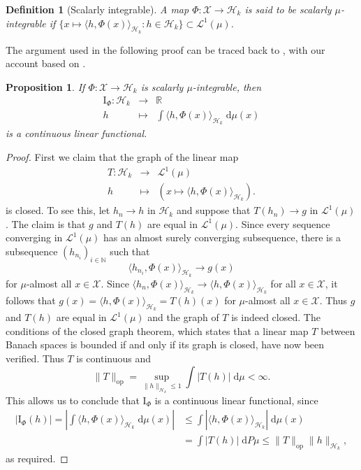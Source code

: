 \documentclass[12pt,paper=letter]{scrreprt}
\newtheorem{proposition}{Proposition}[chapter]
\newtheorem{definition}{Definition}[chapter]
\begin{document}
\begin{definition}[Scalarly integrable]
A map $\Phi : \mathcal{X} \rightarrow \mathcal{H}_k$ is said to be \emph{scalarly} $\mu$-\emph{integrable} if $\{ x \mapsto \langle h , \Phi(x) \rangle_{\mathcal{H}_k} : h \in \mathcal{H}_k \} \subset \mathcal{L}^1(\mu)$.
\end{definition}

\noindent The argument used in the following proof can be traced back to \citet{dunford1937integration}, with our account based on \citet[][Lemma 2.1.1]{schwabik2005topics}.

\begin{proposition} \label{prop: Dunford}
If $\Phi : \mathcal{X} \rightarrow \mathcal{H}_k$ is scalarly $\mu$-integrable, then 
\begin{eqnarray*}
\mathrm{I}_\Phi : \mathcal{H}_k & \rightarrow & \mathbb{R} \\
h & \mapsto & \int \langle h , \Phi(x) \rangle_{\mathcal{H}_k} \; \mathrm{d}\mu(x) 
\end{eqnarray*}
is a continuous linear functional.
\end{proposition}
\begin{proof}
First we claim that the graph of the linear map
\begin{eqnarray*}
T : \mathcal{H}_k & \rightarrow & \mathcal{L}^1(\mu) \\
h & \mapsto & ( x \mapsto \langle h , \Phi(x) \rangle_{\mathcal{H}_k} ) .
\end{eqnarray*}
is closed.
To see this, let $h_n \rightarrow h$ in $\mathcal{H}_k$ and suppose that $T(h_n) \rightarrow g$ in $\mathcal{L}^1(\mu)$.
The claim is that $g$ and $T(h)$ are equal in $\mathcal{L}^1(\mu)$.
Since every sequence converging in $\mathcal{L}^1(\mu)$ has an almost surely converging subsequence, there is a subsequence $(h_{n_i})_{i \in \mathbb{N}}$ such that
$$
\langle h_{n_i} , \Phi(x) \rangle_{\mathcal{H}_k} \rightarrow g(x)
$$
for $\mu$-almost all $x \in \mathcal{X}$.
Since $\langle h_n , \Phi(x) \rangle_{\mathcal{H}_k} \rightarrow \langle h , \Phi(x) \rangle_{\mathcal{H}_k}$ for all $x \in \mathcal{X}$, it follows that $g(x) = \langle h , \Phi(x) \rangle_{\mathcal{H}_k} = T(h)(x)$ for $\mu$-almost all $x \in \mathcal{X}$.
Thus $g$ and $T(h)$ are equal in $\mathcal{L}^1(\mu)$ and the graph of $T$ is indeed closed.
The conditions of the closed graph theorem, which states that a linear map $T$ between Banach spaces is bounded if and only if its graph is closed, have now been verified.
Thus $T$ is continuous and 
$$
\|T\|_{\mathrm{op}} = \sup_{\|h\|_{\mathcal{H}_k} \leq 1} \int |T(h)| \; \mathrm{d}\mu < \infty .
$$
This allows us to conclude that $\mathrm{I}_\Phi$ is a continuous linear functional, since
\begin{align*}
|\mathrm{I}_\Phi(h)|
= \left| \int \langle h , \Phi(x) \rangle_{\mathcal{H}_k} \; \mathrm{d}\mu(x) \right| 
& \leq \int | \langle h , \Phi(x) \rangle_{\mathcal{H}_k} | \; \mathrm{d}\mu(x) \\
& = \int |T(h)| \; \mathrm{d}P\mu
\leq \|T\|_{\mathrm{op}} \|h\|_{\mathcal{H}_k} ,
\end{align*}
as required.
\end{proof}
\end{document}
